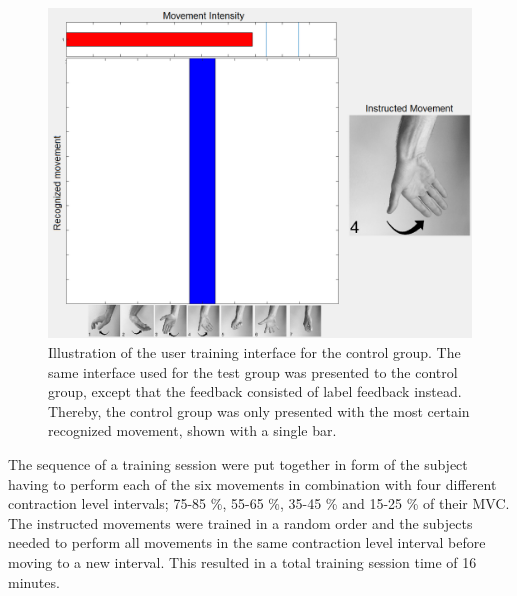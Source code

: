\vspace{-0.5cm}
\begin{figure}[H]
	\includegraphics[width=.47\textwidth]{figures/xBackground/usertraincontrolGUI}
	\caption{Illustration of the user training interface for the control group. The same interface used for the test group was presented to the control group, except that the feedback consisted of label feedback instead. Thereby, the control group was only presented with the most certain recognized movement, shown with a single bar.}
	\label{fig:control}
\end{figure}  
The sequence of a training session were put together in form of the subject having to perform each of the six movements in combination with four different contraction level intervals; 75-85 \%, 55-65 \%, 35-45 \% and 15-25 \% of their MVC. The instructed movements were trained in a random order and the subjects needed to perform all movements in the same contraction level interval before moving to a new interval. This resulted in a total training session time of 16 minutes.  

     



